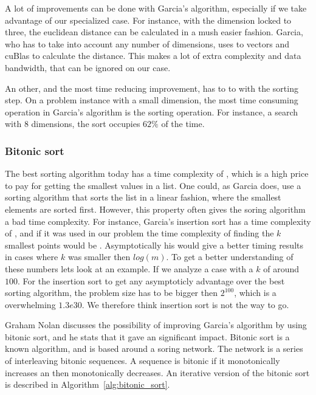 A lot of improvements can be done with Garcia's algorithm, especially if we take advantage of our specialized case. For instance, with the dimension locked to three, the euclidean distance can be calculated in a mush easier fashion. Garcia, who has to take into account any number of dimensions, uses to vectors and cuBlas to calculate the distance. This makes a lot of extra complexity and data bandwidth, that can be ignored on our case.


An other, and the most time reducing improvement, has to to with the sorting step. On a problem instance with a small dimension, the most time consuming operation in Garcia's algorithm is the sorting operation. For instance, a search with $8$ dimensions, the sort occupies $62\%$ of the time. 

\subsubsection{Bitonic sort} %
\label{ssub:bitonic_sort}


The best sorting algorithm today has a time complexity of , which is a high price to pay for getting the smallest values in a list.  One could, as Garcia does, use a sorting algorithm that sorts the list in a linear fashion, where the smallest elements are sorted first. However, this property often gives the soring algorithm a bad time complexity. For instance, Garcia's insertion sort\cite{Cormen:2001} has a time complexity of , and if it was used in our problem the time complexity of finding the $k$ smallest points would be . Asymptotically his would give a better timing results in cases where $k$ was smaller then $log(m)$. To get a better understanding of these numbers lets look at an example. If we analyze a case with a $k$ of around $100$. For the insertion sort to get any asymptoticly advantage over the best sorting algorithm, the problem size has to be bigger then $2^{100}$, which is a overwhelming $1.3e30$. We therefore think insertion sort is not the way to go.

Graham Nolan discusses the possibility of improving Garcia's algorithm by using bitonic sort, and he stats that it gave an significant impact\citep{Nolan}. Bitonic sort is a known  algorithm, and is based around a soring network. The network is a series of interleaving bitonic sequences. A sequence is bitonic if it monotonically increases an then monotonically decreases\cite{Cormen:2001}. An iterative version of the bitonic sort is described in Algorithm~\ref{alg:bitonic_sort}.

